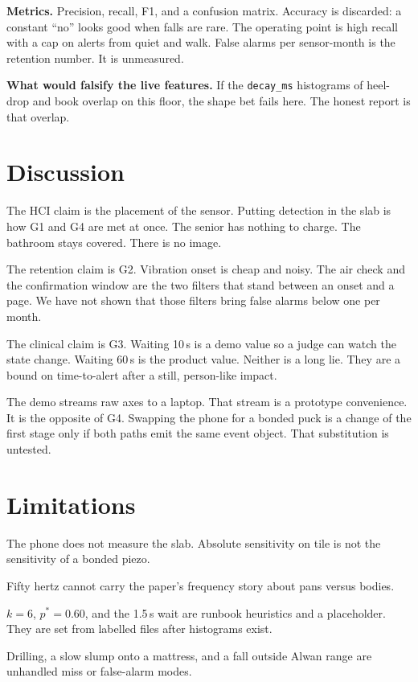 \documentclass[sigconf]{acmart}
\begin{document}
\textbf{Metrics.} Precision, recall, F1, and a confusion matrix. Accuracy is discarded: a constant ``no'' looks good when falls are rare. The operating point is high recall with a cap on alerts from quiet and walk. False alarms per sensor-month is the retention number. It is unmeasured.

\textbf{What would falsify the live features.} If the \texttt{decay\_ms} histograms of heel-drop and book overlap on this floor, the shape bet fails here. The honest report is that overlap.

\section{Discussion}

The HCI claim is the placement of the sensor. Putting detection in the slab is how G1 and G4 are met at once. The senior has nothing to charge. The bathroom stays covered. There is no image.

The retention claim is G2. Vibration onset is cheap and noisy. The air check and the confirmation window are the two filters that stand between an onset and a page. We have not shown that those filters bring false alarms below one per month.

The clinical claim is G3. Waiting 10\,s is a demo value so a judge can watch the state change. Waiting 60\,s is the product value. Neither is a long lie. They are a bound on time-to-alert after a still, person-like impact.

The demo streams raw axes to a laptop. That stream is a prototype convenience. It is the opposite of G4. Swapping the phone for a bonded puck is a change of the first stage only if both paths emit the same event object. That substitution is untested.

\section{Limitations}

The phone does not measure the slab. Absolute sensitivity on tile is not the sensitivity of a bonded piezo.

Fifty hertz cannot carry the paper's frequency story about pans versus bodies.

\(k=6\), \(p^*=0.60\), and the 1.5\,s wait are runbook heuristics and a placeholder. They are set from labelled files after histograms exist.

Drilling, a slow slump onto a mattress, and a fall outside Alwan range are unhandled miss or false-alarm modes.
\end{document}
